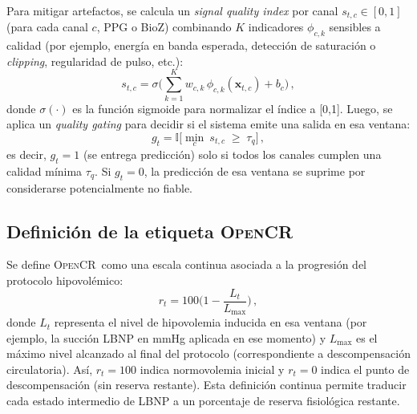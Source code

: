 \documentclass[10pt,a4paper,twocolumn]{article}
\newcommand{\OpenCR}{\textsc{OpenCR}}
\begin{document}
Para mitigar artefactos, se calcula un \emph{signal quality index} por canal $s_{t,c}\in[0,1]$ (para cada canal $c$, PPG o BioZ) combinando $K$ indicadores $\phi_{c,k}$ sensibles a calidad (por ejemplo, energ\'ia en banda esperada, detecci\'on de saturaci\'on o \emph{clipping}, regularidad de pulso, etc.):
\begin{equation}
s_{t,c} = \sigma\!\Bigg(\sum_{k=1}^{K} w_{c,k}\,\phi_{c,k}(\bm{x}_{t,c}) + b_c\Bigg)\,,
\end{equation}
donde $\sigma(\cdot)$ es la funci\'on sigmoide para normalizar el \'indice a [0,1]. Luego, se aplica un \emph{quality gating} para decidir si el sistema emite una salida en esa ventana:
\begin{equation}
g_t = \mathbb{I}\!\Big[\min_{c}~s_{t,c} \;\ge\; \tau_q\Big]\,,
\end{equation}
es decir, $g_t=1$ (se entrega predicci\'on) solo si todos los canales cumplen una calidad m\'inima $\tau_q$. Si $g_t=0$, la predicci\'on de esa ventana se suprime por considerarse potencialmente no fiable.

\subsection{Definici\'on de la etiqueta \OpenCR}

Se define \OpenCR\ como una escala continua asociada a la progresi\'on del protocolo hipovol\'emico:
\begin{equation}
r_t = 100\Big(1 - \frac{L_t}{L_{\max}}\Big)\,,
\label{eq:opencr_def}
\end{equation}
donde $L_t$ representa el nivel de hipovolemia inducida en esa ventana (por ejemplo, la succi\'on LBNP en mmHg aplicada en ese momento) y $L_{\max}$ es el m\'aximo nivel alcanzado al final del protocolo (correspondiente a descompensaci\'on circulatoria). As\'i, $r_t=100$ indica normovolemia inicial y $r_t=0$ indica el punto de descompensaci\'on (sin reserva restante). Esta definici\'on continua permite traducir cada estado intermedio de LBNP a un porcentaje de reserva fisiol\'ogica restante.
\end{document}
